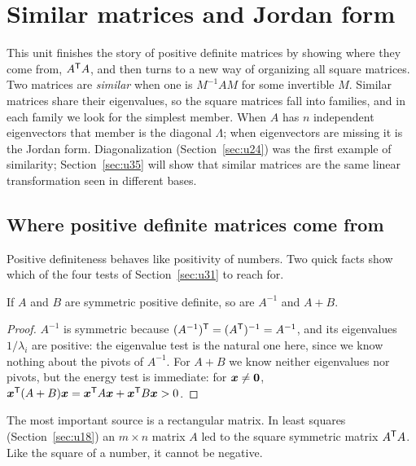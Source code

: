 \section{Similar matrices and Jordan form}\label{sec:u32}

This unit finishes the story of positive definite matrices by showing where they come from,
$A^{\mathsf{T}} A$, and then turns to a new way of organizing all square matrices. Two matrices are
\emph{similar} when one is $M^{-1}AM$ for some invertible $M$. Similar matrices share their
eigenvalues, so the square matrices fall into families, and in each family we look for the
simplest member. When $A$ has $n$ independent eigenvectors that member is the diagonal $\Lambda$;
when eigenvectors are missing it is the Jordan form. Diagonalization (Section~\ref{sec:u24}) was
the first example of similarity; Section~\ref{sec:u35} will show that similar matrices are the
same linear transformation seen in different bases.

\subsection{Where positive definite matrices come from}

Positive definiteness behaves like positivity of numbers. Two quick facts show which of the
four tests of Section~\ref{sec:u31} to reach for.

\begin{proposition}\label{prop:u32-inverse-sum}
If $A$ and $B$ are symmetric positive definite, so are $A^{-1}$ and $A+B$.
\end{proposition}
\begin{proof}
$A^{-1}$ is symmetric because $(A^{-1})^{\mathsf{T}}=(A^{\mathsf{T}})^{-1}=A^{-1}$, and its eigenvalues $1/\lambda_i$ are
positive: the eigenvalue test is the natural one here, since we know nothing about the pivots
of $A^{-1}$. For $A+B$ we know neither eigenvalues nor pivots, but the energy test is immediate:
for $\boldsymbol{x}\ne\boldsymbol{0}$, $\boldsymbol{x}^{\mathsf{T}}(A+B)\boldsymbol{x}=\boldsymbol{x}^{\mathsf{T}} A\boldsymbol{x}+\boldsymbol{x}^{\mathsf{T}} B\boldsymbol{x}>0$.
\end{proof}

The most important source is a rectangular matrix. In least squares (Section~\ref{sec:u18}) an
$m\times n$ matrix $A$ led to the square symmetric matrix $A^{\mathsf{T}} A$. Like the square of a number, it
cannot be negative.

